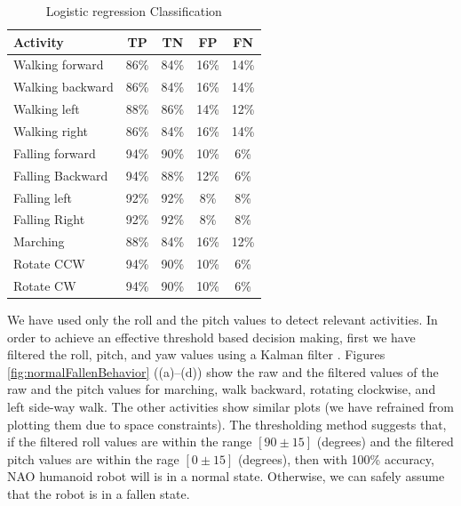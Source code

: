 \documentclass[letterpaper]{article}
\begin{document}
\begin{table}[!ht]
\caption{Logistic regression Classification}
	\label{tab:robot-logistic-class}
	\centering
		\begin{tabular} {| l | c | c | c| c|}
		\hline
			{\bf Activity} & {\bf  TP}  &	{\bf TN}  &	{\bf FP} &	{\bf FN} \\ 
\hline
			Walking forward	& 86\%	& 84\%	& 16\%	& 14\% \\ \hline
			Walking backward	& 86\%	& 84\%	& 16\%	& 14\% \\ \hline
			Walking left 	& 88\%	& 86\%	& 14\%	& 12\% \\ \hline
			Walking right 	& 86\%	& 84\%	& 16\%	& 14\% \\ \hline
			Falling forward	& 94\%	& 90\%	& 10\%	& 6\%	 \\ \hline
			Falling Backward	& 94\%	& 88\%	& 12\%	& 6\%	 \\ \hline
			Falling left	& 92\%	& 92\%	& 8\%	& 8\%	 \\ \hline
			Falling Right	& 92\%	& 92\%	& 8\%	& 8\%	 \\ \hline
			Marching	& 88\%	& 84\%	& 16\%	& 12\%	 \\ \hline
			Rotate CCW	& 94\%	& 90\%	& 10\%	& 6\%	 \\ \hline
			Rotate CW	& 94\%	& 90\%	& 10\%	& 6\%	 \\ \hline
		\end{tabular}
\end{table}


We have used only the roll and the pitch values  to detect relevant activities. In order to achieve 
an effective threshold based decision making, first we have filtered the roll, pitch, and
yaw values using a Kalman filter \cite{Welch:1995:IKF:897831}. Figures 
\ref{fig:normalFallenBehavior} ((a)--(d)) show
the raw and the filtered values of the raw and the pitch values for marching, walk backward,
rotating clockwise, and left side-way walk. The other activities show similar plots (we have 
refrained from plotting them due to space constraints). The thresholding method
suggests that, if the filtered roll values are within the range $[90\pm15]$ (degrees) and the
filtered pitch values are within the rage $[0\pm15]$ (degrees), then with 100\% accuracy, NAO 
humanoid robot will is in a normal state. Otherwise, we can safely assume that the robot is in 
a fallen state.   
\end{document}
